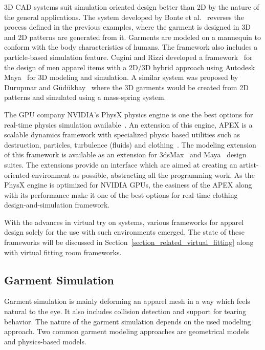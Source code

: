  3D CAD systems suit simulation oriented design better than 2D by the nature of the general applications. The system developed by Bonte et al.~\cite{Bonte2002} reverses the process defined in the previous examples, where the garment is designed in 3D and 2D patterns are generated from it. Garments are modeled on a mannequin to conform with the body characteristics of humans. The framework also includes a particle-based simulation feature. Cugini and Rizzi developed a framework~\cite{Cugini2002} for the design of men apparel items with a 2D/3D hybrid approach using Autodesk Maya~\cite{Autodesk2013} for 3D modeling and simulation. A similar system was proposed by Durup{\i}nar and G{\"u}d{\"u}kbay~\cite{Durupinar2007} where the 3D garments  would be created from 2D patterns and simulated using a mass-spring system.
 
 The GPU company NVIDIA's PhysX physics engine is one the best options for real-time physics simulation available~\cite{WikiPhysx2012}. An extension of this engine, APEX is a scalable dynamics framework with specialized physic based utilities such as destruction, particles, turbulence (fluids) and clothing~\cite{Nvidia2013}. The modeling extension of this framework is available as an extension for 3dsMax~\cite{Autodesk3DS2013} and Maya~\cite{Autodesk2013} design suites. The extensions provide an interface which are aimed at creating an artist-oriented environment as possible, abstracting all the programming work. As the PhysX engine is optimized for NVIDIA GPUs, the easiness of the APEX along with its performance make it one of the  best options for real-time clothing design-and-simulation framework.  
 
With the advances in virtual try on systems, various frameworks for apparel design solely for the use with such environments emerged. The state of these frameworks will be discussed in Section~\ref{section_related_virtual_fitting} along with virtual fitting room frameworks.  
   
\subsection{Garment Simulation}
Garment simulation is mainly deforming an apparel mesh in a way which feels natural to the eye. It also includes collision detection and support for tearing behavior. The nature of the garment simulation depends on the used modeling approach. Two common garment modeling approaches are geometrical models~\cite{Weil1986} and physics-based models. 

